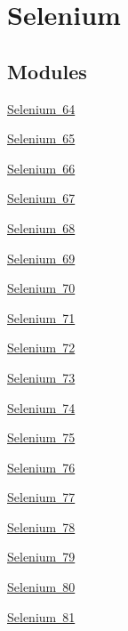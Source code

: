 \hypertarget{group___isotope_const-_selenium}{}\section{Selenium}
\label{group___isotope_const-_selenium}
\subsection*{Modules}
\begin{DoxyCompactItemize}
\item 
\mbox{\hyperlink{group___isotope_const-_selenium-_se64}{Selenium 64}}
\item 
\mbox{\hyperlink{group___isotope_const-_selenium-_se65}{Selenium 65}}
\item 
\mbox{\hyperlink{group___isotope_const-_selenium-_se66}{Selenium 66}}
\item 
\mbox{\hyperlink{group___isotope_const-_selenium-_se67}{Selenium 67}}
\item 
\mbox{\hyperlink{group___isotope_const-_selenium-_se68}{Selenium 68}}
\item 
\mbox{\hyperlink{group___isotope_const-_selenium-_se69}{Selenium 69}}
\item 
\mbox{\hyperlink{group___isotope_const-_selenium-_se70}{Selenium 70}}
\item 
\mbox{\hyperlink{group___isotope_const-_selenium-_se71}{Selenium 71}}
\item 
\mbox{\hyperlink{group___isotope_const-_selenium-_se72}{Selenium 72}}
\item 
\mbox{\hyperlink{group___isotope_const-_selenium-_se73}{Selenium 73}}
\item 
\mbox{\hyperlink{group___isotope_const-_selenium-_se74}{Selenium 74}}
\item 
\mbox{\hyperlink{group___isotope_const-_selenium-_se75}{Selenium 75}}
\item 
\mbox{\hyperlink{group___isotope_const-_selenium-_se76}{Selenium 76}}
\item 
\mbox{\hyperlink{group___isotope_const-_selenium-_se77}{Selenium 77}}
\item 
\mbox{\hyperlink{group___isotope_const-_selenium-_se78}{Selenium 78}}
\item 
\mbox{\hyperlink{group___isotope_const-_selenium-_se79}{Selenium 79}}
\item 
\mbox{\hyperlink{group___isotope_const-_selenium-_se80}{Selenium 80}}
\item 
\mbox{\hyperlink{group___isotope_const-_selenium-_se81}{Selenium 81}}

\end{DoxyCompactItemize}
